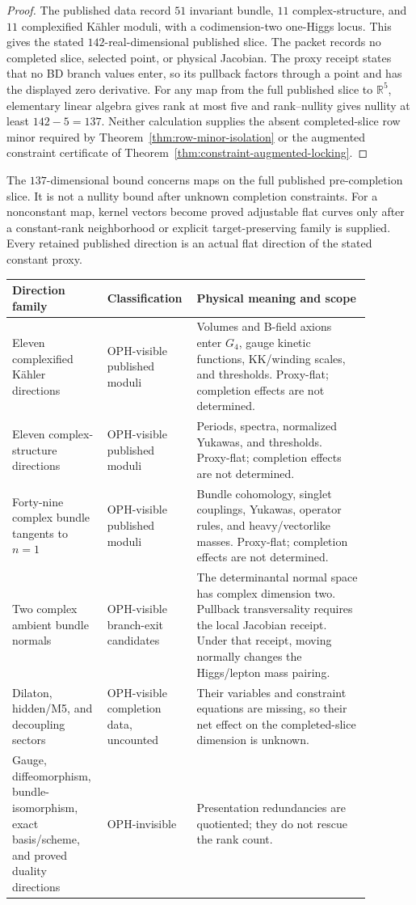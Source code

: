 \documentclass[11pt]{article}
\theoremstyle{remark}
\theoremstyle{plain}
\begin{document}
\begin{proof}
The published data record \(51\) invariant bundle, \(11\) complex-structure, and \(11\)
complexified K\"ahler moduli, with a codimension-two one-Higgs locus. This gives the stated
\(142\)-real-dimensional published slice. The packet records no completed slice, selected point,
or physical Jacobian. The proxy receipt states that no BD branch values enter, so its pullback
factors through a point and has the displayed zero derivative. For any map from the full
published slice to \(\mathbb R^5\), elementary linear algebra gives rank at most five and
rank--nullity gives nullity at least \(142-5=137\). Neither calculation supplies the absent
completed-slice row minor required by Theorem~\ref{thm:row-minor-isolation} or the augmented
constraint certificate of Theorem~\ref{thm:constraint-augmented-locking}.
\end{proof}

The \(137\)-dimensional bound concerns maps on the full published pre-completion slice. It is not
a nullity bound after unknown completion constraints. For a nonconstant map, kernel vectors become
proved adjustable flat curves only after a constant-rank neighborhood or explicit
target-preserving family is supplied. Every retained published direction is an actual flat
direction of the stated constant proxy.

\begin{longtable}{L{0.25\linewidth}L{0.17\linewidth}L{0.46\linewidth}}
\toprule
\textbf{Direction family} & \textbf{Classification} & \textbf{Physical meaning and scope} \\
\midrule
Eleven complexified K\"ahler directions & OPH-visible published moduli & Volumes and B-field
axions enter \(G_4\), gauge kinetic functions, KK/winding scales, and thresholds. Proxy-flat;
completion effects are not determined. \\
Eleven complex-structure directions & OPH-visible published moduli & Periods, spectra, normalized
Yukawas, and thresholds. Proxy-flat; completion effects are not determined. \\
Forty-nine complex bundle tangents to \(n=1\) & OPH-visible published moduli & Bundle cohomology,
singlet couplings, Yukawas, operator rules, and heavy/vectorlike masses. Proxy-flat; completion
effects are not determined. \\
Two complex ambient bundle normals & OPH-visible branch-exit candidates & The determinantal
normal space has complex dimension two. Pullback transversality requires the local Jacobian
receipt. Under that receipt, moving normally changes the Higgs/lepton mass pairing. \\
Dilaton, hidden/M5, and decoupling sectors & OPH-visible completion data, uncounted & Their
variables and constraint equations are missing, so their net effect on the completed-slice
dimension is unknown. \\
Gauge, diffeomorphism, bundle-isomorphism, exact basis/scheme, and proved duality directions &
OPH-invisible & Presentation redundancies are quotiented; they do not rescue the rank count. \\
\bottomrule
\end{longtable}
\end{document}
